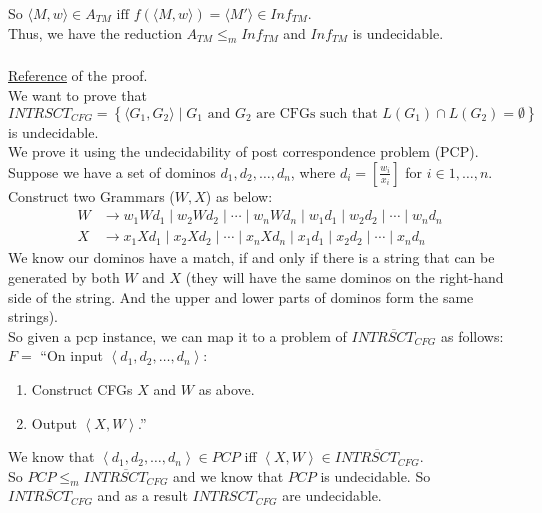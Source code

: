 \documentclass{article}
\begin{document}
So \(\langle M, w\rangle \in A_{TM} \text{ iff } f(\langle M, w\rangle) = \langle M'\rangle \in Inf_{TM}\).\\
Thus, we have the reduction \(A_{TM} \leq_{m} Inf_{TM}\) and \(Inf_{TM}\) is undecidable.

\subsubsection{}
\href{http://kilby.stanford.edu/~rvg/154/handouts/ambi.html}{Reference} of the proof.\\
We want to prove that \(INTRSCT_{CFG} = \left\{\langle G_1, G_2\rangle\mid G_1 \text{ and } G_2 \text{ are CFGs such that } L(G_1) \cap L(G_2) = \emptyset\right\}\) is undecidable.\\
We prove it using the undecidability of post correspondence problem (PCP).
Suppose we have a set of dominos \(d_1, d_2, \dots, d_n\), where \(d_i=\left[\frac{w_i}{x_i}\right]\) for \(i\in {1, \ldots, n}\).
Construct two Grammars (\(W, X\)) as below:
\begin{align*}
W &\to w_1Wd_1 \mid w_2Wd_2 \mid \cdots \mid w_nWd_n \mid w_1d_1 \mid w_2d_2 \mid \cdots \mid w_nd_n\\
X &\to x_1Xd_1 \mid x_2Xd_2 \mid \cdots \mid x_nXd_n \mid x_1d_1 \mid x_2d_2 \mid \cdots \mid x_nd_n
\end{align*}
We know our dominos have a match, if and only if there is a string that can be generated by both \(W\) and \(X\)
(they will have the same dominos on the right-hand side of the string. And the upper and lower parts of dominos form the same strings).\\
So given a pcp instance, we can map it to a problem of \(\overline{INTRSCT_{CFG}}\) as follows:\\[7pt]
\(F = \) ``On input \(\left\langle d_1, d_2, \dots, d_n\right\rangle\):
\begin{enumerate}
\item Construct CFGs \(X\) and \(W\) as above.
\item Output \(\left\langle X, W\right\rangle\).''
\end{enumerate}

We know that \(\left\langle d_1, d_2, \dots, d_n\right\rangle \in PCP\) iff \(\left\langle X, W\right\rangle \in \overline{INTRSCT_{CFG}}\).\\
So \(PCP\leq_m \overline{INTRSCT_{CFG}}\) and we know that \(PCP\) is undecidable. So \(\overline{INTRSCT_{CFG}}\) and as a result \(INTRSCT_{CFG}\) are undecidable.
\end{document}
